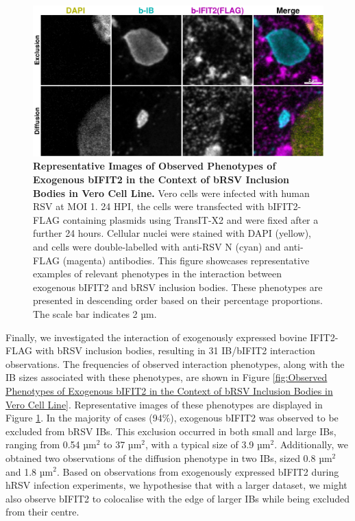 \begin{figure}
    \centering
    \includegraphics[width=1\linewidth]{09. Chapter 4/Figs/02. Overexpression/02. IFIT2/09. bi2f-brsv.pdf}
    \caption[Representative Images of Observed Phenotypes of Exogenous bIFIT2 in the Context of bRSV Inclusion Bodies in Vero Cell Line.]{\textbf{Representative Images of Observed Phenotypes of Exogenous bIFIT2 in the Context of bRSV Inclusion Bodies in Vero Cell Line.} Vero cells were infected with human RSV at MOI 1. 24 HPI, the cells were transfected with bIFIT2-FLAG containing plasmids using TransIT-X2 and were fixed after a further 24 hours. Cellular nuclei were stained with DAPI (yellow), and cells were double-labelled with anti-RSV N (cyan) and anti-FLAG (magenta) antibodies. This figure showcases representative examples of relevant phenotypes in the interaction between exogenous bIFIT2 and bRSV inclusion bodies. These phenotypes are presented in descending order based on their percentage proportions. The scale bar indicates 2 µm.}
    \label{fig:Representative Images of Observed Phenotypes of Exogenous bIFIT2 in the Context of bRSV Inclusion Bodies in Vero Cell Line}
\end{figure}

Finally, we investigated the interaction of exogenously expressed bovine IFIT2-FLAG with bRSV inclusion bodies, resulting in 31 IB/bIFIT2 interaction observations. The frequencies of observed interaction phenotypes, along with the IB sizes associated with these phenotypes, are shown in Figure \ref{fig:Observed Phenotypes of Exogenous bIFIT2 in the Context of bRSV Inclusion Bodies in Vero Cell Line}. Representative images of these phenotypes are displayed in Figure \ref{fig:Representative Images of Observed Phenotypes of Exogenous bIFIT2 in the Context of bRSV Inclusion Bodies in Vero Cell Line}. In the majority of cases (94\%), exogenous bIFIT2 was observed to be excluded from bRSV IBs. This exclusion occurred in both small and large IBs, ranging from 0.54 \(\mbox{µm}^2\) to 37 \(\mbox{µm}^2\), with a typical size of 3.9 \(\mbox{µm}^2\). Additionally, we obtained two observations of the diffusion phenotype in two IBs, sized 0.8 \(\mbox{µm}^2\) and 1.8 \(\mbox{µm}^2\). Based on observations from exogenously expressed bIFIT2 during hRSV infection experiments, we hypothesise that with a larger dataset, we might also observe bIFIT2 to colocalise with the edge of larger IBs while being excluded from their centre.

